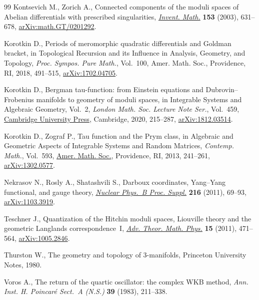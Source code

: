 \documentclass[pdftex]{sigma}
\numberwithin{equation}{section}
\theoremstyle{definition}
\begin{document}
\begin{thebibliography}{99}
Kontsevich M., Zorich A., Connected components of the moduli spaces of
 {A}belian differentials with prescribed singularities, \href{https://doi.org/10.1007/s00222-003-0303-x}{\textit{Invent. Math.}}
 \textbf{153} (2003), 631--678, \href{https://arxiv.org/abs/math.GT/0201292}{arXiv:math.GT/0201292}.

Korotkin D., Periods of meromorphic quadratic differentials and {G}oldman
 bracket, in Topological Recursion and its Influence in Analysis, Geometry,
 and Topology, \textit{Proc. Sympos. Pure Math.}, Vol.~100, Amer. Math. Soc.,
 Providence, RI, 2018, 491--515, \href{https://arxiv.org/abs/1702.04705}{arXiv:1702.04705}.

Korotkin D., Bergman tau-function: from {E}instein equations and
 {D}ubrovin--{F}robenius manifolds to geometry of moduli spaces, in Integrable
 Systems and Algebraic Geometry, {V}ol.~2, \textit{London Math. Soc. Lecture
 Note Ser.}, Vol.~459, \href{https://doi.org/10.1017/9781108773355.008}{Cambridge University Press}, Cambridge, 2020, 215--287,
 \href{https://arxiv.org/abs/1812.03514}{arXiv:1812.03514}.

Korotkin D., Zograf P., Tau function and the {P}rym class, in Algebraic and
 Geometric Aspects of Integrable Systems and Random Matrices, \textit{Contemp.
 Math.}, Vol.~593, \href{https://doi.org/10.1090/conm/593/11874}{Amer. Math. Soc.}, Providence, RI, 2013, 241--261,
 \href{https://arxiv.org/abs/1302.0577}{arXiv:1302.0577}.

Nekrasov N., Rosly A., Shatashvili S., Darboux coordinates, {Y}ang--{Y}ang
 functional, and gauge theory, \href{https://doi.org/10.1016/j.nuclphysbps.2011.04.150}{\textit{Nuclear Phys.~B Proc. Suppl.}}
 \textbf{216} (2011), 69--93, \href{https://arxiv.org/abs/1103.3919}{arXiv:1103.3919}.

Teschner J., Quantization of the {H}itchin moduli spaces, {L}iouville theory
 and the geometric {L}anglands correspondence~{I}, \href{https://dx.doi.org/10.4310/ATMP.2011.v15.n2.a6}{\textit{Adv. Theor. Math.
 Phys.}} \textbf{15} (2011), 471--564, \href{https://arxiv.org/abs/1005.2846}{arXiv:1005.2846}.

Thurston W., The geometry and topology of 3-manifolds, Princeton University
 Notes, 1980.

Voros A., The return of the quartic oscillator: the complex {WKB} method,
 \textit{Ann. Inst. H. Poincar\'e Sect.~A (N.S.)} \textbf{39} (1983),
 211--338.

\end{thebibliography}\LastPageEnding
\end{document}
